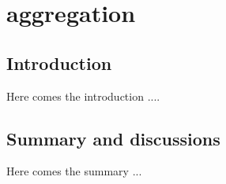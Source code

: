 \chapter{aggregation}
\label{chap:aggregation}



\section{Introduction}

Here comes the introduction \cite{appPS1KImouseModelRevIntraneuronalAbeta,S100A9upregulationProtective}....


\section{Summary and discussions}

Here comes the summary ... 

\endinput
